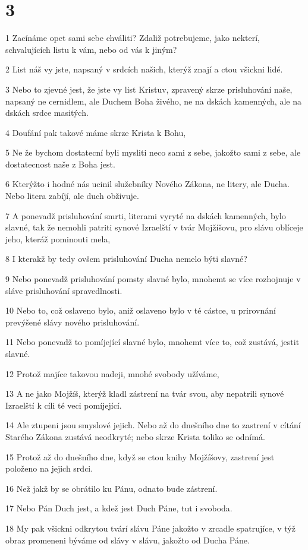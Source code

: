 \chapter{3}

\par 1 Zacínáme opet sami sebe chváliti? Zdaliž potrebujeme, jako nekterí, schvalujících listu k vám, nebo od vás k jiným?
\par 2 List náš vy jste, napsaný v srdcích našich, kterýž znají a ctou všickni lidé.
\par 3 Nebo to zjevné jest, že jste vy list Kristuv, zpravený skrze prisluhování naše, napsaný ne cernidlem, ale Duchem Boha živého, ne na dskách kamenných, ale na dskách srdce masitých.
\par 4 Doufání pak takové máme skrze Krista k Bohu,
\par 5 Ne že bychom dostatecní byli mysliti neco sami z sebe, jakožto sami z sebe, ale dostatecnost naše z Boha jest.
\par 6 Kterýžto i hodné nás ucinil služebníky Nového Zákona, ne litery, ale Ducha. Nebo litera zabíjí, ale duch obživuje.
\par 7 A ponevadž prisluhování smrti, literami vyryté na dskách kamenných, bylo slavné, tak že nemohli patriti synové Izraelští v tvár Mojžíšovu, pro slávu oblíceje jeho, kteráž pominouti mela,
\par 8 I kterakž by tedy ovšem prisluhování Ducha nemelo býti slavné?
\par 9 Nebo ponevadž prisluhování pomsty slavné bylo, mnohemt se více rozhojnuje v sláve prisluhování spravedlnosti.
\par 10 Nebo to, což oslaveno bylo, aniž oslaveno bylo v té cástce, u prirovnání prevýšené slávy nového prisluhování.
\par 11 Nebo ponevadž to pomíjející slavné bylo, mnohemt více to, což zustává, jestit slavné.
\par 12 Protož majíce takovou nadeji, mnohé svobody užíváme,
\par 13 A ne jako Mojžíš, kterýž kladl zástrení na tvár svou, aby nepatrili synové Izraelští k cíli té veci pomíjející.
\par 14 Ale ztupeni jsou smyslové jejich. Nebo až do dnešního dne to zastrení v cítání Starého Zákona zustává neodkryté; nebo skrze Krista toliko se odnímá.
\par 15 Protož až do dnešního dne, když se ctou knihy Mojžíšovy, zastrení jest položeno na jejich srdci.
\par 16 Než jakž by se obrátilo ku Pánu, odnato bude zástrení.
\par 17 Nebo Pán Duch jest, a kdež jest Duch Páne, tut i svoboda.
\par 18 My pak všickni odkrytou tvárí slávu Páne jakožto v zrcadle spatrujíce, v týž obraz promeneni býváme od slávy v slávu, jakožto od Ducha Páne.

